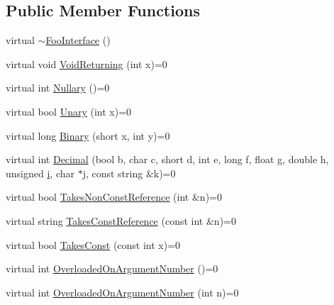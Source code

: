 \subsection*{Public Member Functions}
\begin{DoxyCompactItemize}
\item 
virtual \hyperlink{classtesting_1_1gmock__generated__function__mockers__test_1_1FooInterface_ad4eb4709c9ae9b1cdaded8d05567cdbb}{$\sim$\+Foo\+Interface} ()
\item 
virtual void \hyperlink{classtesting_1_1gmock__generated__function__mockers__test_1_1FooInterface_adf968115cf1260004d8abe372dc71c85}{Void\+Returning} (int x)=0
\item 
virtual int \hyperlink{classtesting_1_1gmock__generated__function__mockers__test_1_1FooInterface_a633e753eafa7f82dde22ecf9492f341c}{Nullary} ()=0
\item 
virtual bool \hyperlink{classtesting_1_1gmock__generated__function__mockers__test_1_1FooInterface_ae0885ac29bc4a3f180f6573d8b1a341e}{Unary} (int x)=0
\item 
virtual long \hyperlink{classtesting_1_1gmock__generated__function__mockers__test_1_1FooInterface_a59ea28b711ece054ce9d57c2dc574ba0}{Binary} (short x, int y)=0
\item 
virtual int \hyperlink{classtesting_1_1gmock__generated__function__mockers__test_1_1FooInterface_a5c5886880581d8dd420c9a187ff884b2}{Decimal} (bool b, char c, short d, int e, long f, float g, double h, unsigned \hyperlink{gtest__output__test__golden__lin_8txt_a7e98b8a17c0aad30ba64d47b74e2a6c1}{i}, char $\ast$j, const string \&k)=0
\item 
virtual bool \hyperlink{classtesting_1_1gmock__generated__function__mockers__test_1_1FooInterface_a694354adfffcee58093298bc12182ff5}{Takes\+Non\+Const\+Reference} (int \&n)=0
\item 
virtual string \hyperlink{classtesting_1_1gmock__generated__function__mockers__test_1_1FooInterface_a3db03c9698ecddfc62f2a1ed2f3c32c2}{Takes\+Const\+Reference} (const int \&n)=0
\item 
virtual bool \hyperlink{classtesting_1_1gmock__generated__function__mockers__test_1_1FooInterface_a8c53e87edf0b9da878e5259f02b7f5dc}{Takes\+Const} (const int x)=0
\item 
virtual int \hyperlink{classtesting_1_1gmock__generated__function__mockers__test_1_1FooInterface_ae9e86ac64fa9acedfb1fa747174c7f43}{Overloaded\+On\+Argument\+Number} ()=0
\item 
virtual int \hyperlink{classtesting_1_1gmock__generated__function__mockers__test_1_1FooInterface_a1b5ff8cc745af475e0abba5d2858e1c9}{Overloaded\+On\+Argument\+Number} (int n)=0

\end{DoxyCompactItemize}
